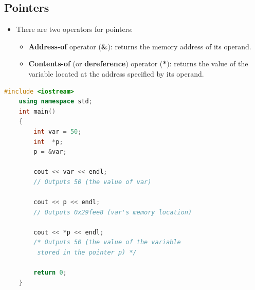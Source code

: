 \documentclass[12pt , a4paper]{article}
\begin{document}
	\subsection{Pointers}
	\begin{itemize}
		\item There are two operators for pointers:\\
		\begin{itemize}
			\item \textbf{Address-of} operator (\textbf{\&}): returns the memory address of its operand.\\
			\item \textbf{Contents-of} (or \textbf{dereference}) operator (\textbf{*}): returns the value of the variable located at the address specified by its operand.\\
		\end{itemize}


	\end{itemize}

	\begin{lstlisting}[language=C++]
	#include <iostream>
	using namespace std;
	int main()
	{
	    int var = 50;
	    int  *p;
	    p = &var;
	
	    cout << var << endl;
	    // Outputs 50 (the value of var)
	
	    cout << p << endl;
	    // Outputs 0x29fee8 (var's memory location)
	
	    cout << *p << endl;
	    /* Outputs 50 (the value of the variable
	     stored in the pointer p) */
	
	    return 0;
	}
	\end{lstlisting}
\end{document}
